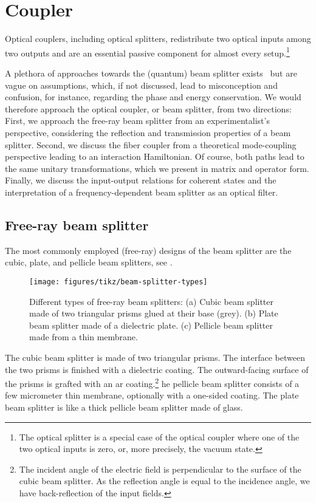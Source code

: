 \section{Coupler}

Optical couplers, including optical splitters, redistribute two optical inputs among two outputs and are an essential passive component for almost every setup.\footnote{The optical splitter is a special case of the optical coupler where one of the two optical inputs is zero, or, more precisely, the vacuum state.}

A plethora of approaches towards the (quantum) beam splitter exists~\cite{Leonhardt2010,Gerry2005,Loudon2000} but are vague on assumptions, which, if not discussed, lead to misconception and confusion, for instance, regarding the phase and energy conservation.
We would therefore approach the optical coupler, or beam splitter, from two directions:
First, we approach the free-ray beam splitter from an experimentalist's perspective, considering the reflection and transmission properties of a beam splitter.
Second, we discuss the fiber coupler from a theoretical mode-coupling perspective leading to an interaction Hamiltonian.
Of course, both paths lead to the same unitary transformations, which we present in matrix and operator form.
Finally, we discuss the input-output relations for coherent states and the interpretation of a frequency-dependent beam splitter as an optical filter.

\subsection{Free-ray beam splitter}

The most commonly employed (free-ray) designs of the beam splitter are the cubic, plate, and pellicle beam splitters, see .
\begin{figure}[htb]
    \centering
    \texttt{[image: figures/tikz/beam-splitter-types]}
    \caption{Different types of free-ray beam splitters: (a) Cubic beam splitter made of two triangular prisms glued at their base (grey). (b) Plate beam splitter made of a dielectric plate. (c) Pellicle beam splitter made from a thin membrane.}\label{fig:beam_splitter_types}
\end{figure}
The cubic beam splitter is made of two triangular prisms.
The interface between the two prisms is finished with a dielectric coating.
The outward-facing surface of the prisms is grafted with an \gls{ar} coating.\footnote{The incident angle of the electric field is perpendicular to the surface of the cubic beam splitter. As the reflection angle is equal to the incidence angle, we have back-reflection of the input fields.}
he pellicle beam splitter consists of a few micrometer thin membrane, optionally with a one-sided coating.
The plate beam splitter is like a thick pellicle beam splitter made of glass.

